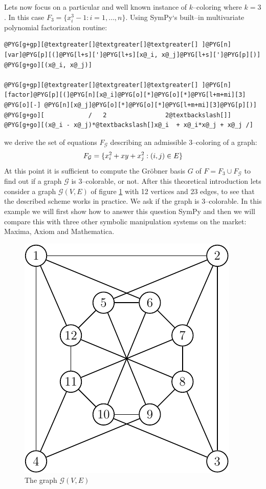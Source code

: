 Lets now focus on a particular and well known instance of $k$--coloring where $k = 3$. In this
case $F_3 = \{ x_i^3 - 1 : i = 1, \ldots, n \}$. Using SymPy`s built--in multivariate polynomial
factorization routine:

\begin{Verbatim}[commandchars=@\[\]]
@PYG[g+gp][@textgreater[]@textgreater[]@textgreater[] ]@PYG[n][var]@PYG[p][(]@PYG[l+s][']@PYG[l+s][x@_i, x@_j]@PYG[l+s][']@PYG[p][)]
@PYG[g+go][(x@_i, x@_j)]

@PYG[g+gp][@textgreater[]@textgreater[]@textgreater[] ]@PYG[n][factor]@PYG[p][(]@PYG[n][x@_i]@PYG[o][*]@PYG[o][*]@PYG[l+m+mi][3] @PYG[o][-] @PYG[n][x@_j]@PYG[o][*]@PYG[o][*]@PYG[l+m+mi][3]@PYG[p][)]
@PYG[g+go][            /   2                2@textbackslash[]]
@PYG[g+go][(x@_i - x@_j)*@textbackslash[]x@_i  + x@_i*x@_j + x@_j /]
\end{Verbatim}
\noindent
we derive the set of equations $F_{\mathcal{G}}$ describing an admissible $3$--coloring of a graph:
\begin{gather}
\begin{split}F_{\mathcal{G}} = \{ x_i^2 + x y + x_j^2 : (i, j) \in E \}\end{split}\notag
\end{gather}
At this point it is sufficient to compute the Gröbner basis $G$ of $F = F_3 \cup F_{\mathcal{G}}$
to find out if a graph $\mathcal{G}$ is $3$--colorable, or not. After this theoretical introduction
lets consider a graph $\mathcal{G}(V, E)$ of figure \ref{fig-graph-nocolor} with 12 vertices and
23 edges, to see that the described scheme works in practice. We ask if the graph is $3$--colorable.
In this example we will first show how to answer this question SymPy and then we will compare this
with three other symbolic manipulation systems on the market: Maxima, Axiom and Mathematica.
\begin{figure}[htbp]
\centering

\includegraphics{graph-nocolor.pdf}
\caption{The graph $\mathcal{G}(V, E)$\label{fig-graph-nocolor}}\end{figure}

